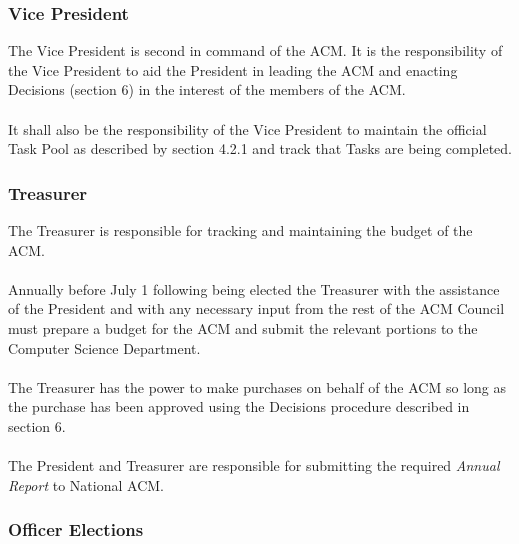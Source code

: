 \documentclass[12pt,titlepage]{article}
\begin{document}
\subsubsection{Vice President}

The Vice President is second in command of the ACM. It is the responsibility of the Vice President to aid the President in leading the ACM and enacting Decisions (section 6) in the interest of the members of the ACM.\\
\\
It shall also be the responsibility of the Vice President to maintain the official Task Pool as described by section 4.2.1 and track that Tasks are being completed.\\

\subsubsection{Treasurer}

The Treasurer is responsible for tracking and maintaining the budget of the ACM.\\
\\
Annually before July 1 following being elected the Treasurer with the assistance of the President and with any necessary input from the rest of the ACM Council must prepare a budget for the ACM and submit the relevant portions to the Computer Science Department.\\
\\
The Treasurer has the power to make purchases on behalf of the ACM so long as the purchase has been approved using the Decisions procedure described in section 6.\\
\\
The President and Treasurer are responsible for submitting the required \emph{Annual Report} to National ACM.

\subsubsection{Officer Elections}
\end{document}
